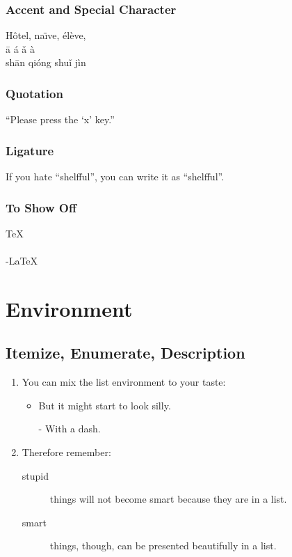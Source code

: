 \documentclass[12pt]{article}
\begin{document}
\subsubsection{Accent and Special Character}
H\^otel, na\"\i ve, \'el\`eve,\\
\= a \' a \v a \` a \\
sh\= an qi\' ong shu\v i j\`in

\subsubsection{Quotation}
``Please press the `x' key.''

\subsubsection{Ligature}
If you hate ``shelfful'', you can write it as ``shelf\mbox{}ful''.

\subsubsection{To Show Off}
\TeX \\
\LaTeXe \\
\AmS-\LaTeX \\

\section{Environment}
\subsection{Itemize, Enumerate, Description}
\begin{enumerate}
	\item You can mix the list environment to your taste:
	      \begin{itemize}
		      \item But it might start to look silly.
		      \item[-] With a dash.
	      \end{itemize}
	\item Therefore remember:
	      \begin{description}
		      \item[stupid] things will not become smart because they are in a list.
		      \item[smart] things, though, can be presented beautifully in a list.
	      \end{description}
\end{enumerate}
\end{document}
